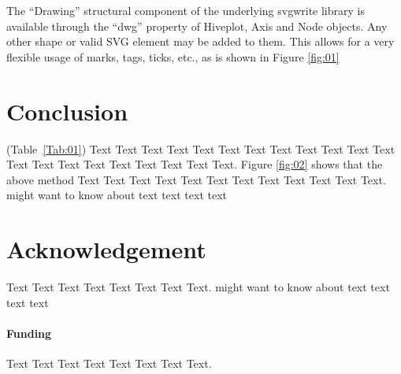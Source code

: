 \documentclass{bioinfo}
\begin{document}
The ``Drawing'' structural component of the underlying svgwrite
library is available through the ``dwg'' property of Hiveplot, Axis
and Node objects. Any other shape or valid SVG element may be added to
them. This allows for a very flexible usage of marks, tags, ticks,
etc., as is shown in Figure \ref{fig:01}








%
%






\section{Conclusion}

(Table~\ref{Tab:01}) Text Text Text Text Text Text  Text Text Text Text Text Text Text Text Text  Text Text Text Text Text Text. Figure \ref{fig:02} shows that the above method  Text Text Text Text  Text Text Text Text Text Text  Text Text.  \citealp{Boffelli03} might want to know about  text text text text


\section*{Acknowledgement}
Text Text Text Text Text Text  Text Text.  \citealp{Boffelli03} might want to know about  text text text text

\paragraph{Funding\textcolon} Text Text Text Text Text Text  Text Text.

%
%
%
%
%
%
%
%
%
\end{document}
